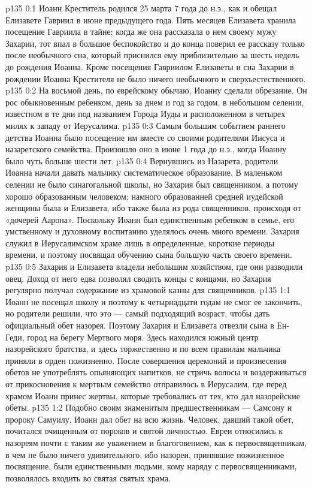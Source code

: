 \vs p135 0:1 Иоанн Креститель родился 25 марта 7 года до н.э., как и обещал Елизавете Гавриил в июне предыдущего года. Пять месяцев Елизавета хранила посещение Гавриила в тайне; когда же она рассказала о нем своему мужу Захарии, тот впал в большое беспокойство и до конца поверил ее рассказу только после необычного сна, который приснился ему приблизительно за шесть недель до рождения Иоанна. Кроме посещения Гавриилом Елизаветы и сна Захарии в рождении Иоанна Крестителя не было ничего необычного и сверхъестественного.
\vs p135 0:2 На восьмой день, по еврейскому обычаю, Иоанну сделали обрезание. Он рос обыкновенным ребенком, день за днем и год за годом, в небольшом селении, известном в те дни под названием Города Иуды и расположенном в четырех милях к западу от Иерусалима.
\vs p135 0:3 Самым большим событием раннего детства Иоанна было посещение им вместе со своими родителями Иисуса и назаретского семейства. Произошло оно в июне 1 года до н.э., когда Иоанну было чуть больше шести лет.
\vs p135 0:4 Вернувшись из Назарета, родители Иоанна начали давать мальчику систематическое образование. В маленьком селении не было синагогальной школы, но Захария был священником, а потому хорошо образованным человеком; намного образованней средней иудейской женщины была и Елизавета, ибо также была из рода священников, происходя от «дочерей Аарона». Поскольку Иоанн был единственным ребенком в семье, его умственному и духовному воспитанию уделялось очень много времени. Захария служил в Иерусалимском храме лишь в определенные, короткие периоды времени, и поэтому посвящал обучению сына большую часть своего времени.
\vs p135 0:5 Захария и Елизавета владели небольшим хозяйством, где они разводили овец. Доход от него едва позволял сводить концы с концами, но Захария регулярно получал содержание из храмовой казны для священников.
\vs p135 1:1 Иоанн не посещал школу и поэтому к четырнадцати годам не смог ее закончить, но родители решили, что это --- самый подходящий возраст, чтобы дать официальный обет назорея. Поэтому Захария и Елизавета отвезли сына в Ен\hyp{}Геди, город на берегу Мертвого моря. Здесь находился южный центр назорейского братства, и здесь торжественно и по всем правилам мальчика приняли в орден пожизненно. После совершения церемоний и произнесения обетов не употреблять опьяняющих напитков, не стричь волосы и воздерживаться от прикосновения к мертвым семейство отправилось в Иерусалим, где перед храмом Иоанн принес жертвы, которые требовались от тех, кто дал назорейские обеты.
\vs p135 1:2 Подобно своим знаменитым предшественникам --- Самсону и пророку Самуилу, Иоанн дал обет на всю жизнь. Человек, давший такой обет, почитался очищенным от пороков и святой личностью. Евреи относились к назореям почти с таким же уважением и благоговением, как к первосвященникам, в чем не было ничего удивительного, ибо назореи, принявшие пожизненное посвящение, были единственными людьми, кому наряду с первосвященниками, позволялось входить во святая святых храма.

